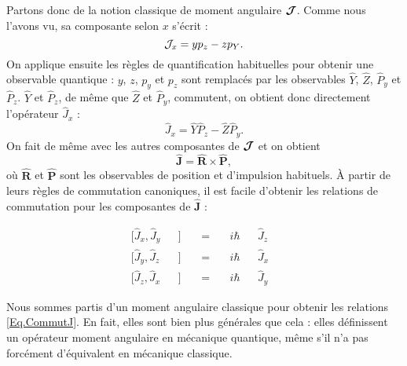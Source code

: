 Partons donc de la notion classique de moment angulaire $\bm{\mathcal{J}}$. Comme nous l'avons vu, sa composante selon $x$ s'écrit :
\begin{equation*}
\mathcal{J}_x=yp_z-zp_Y.
\end{equation*}
On applique ensuite les règles de quantification habituelles pour obtenir une observable quantique : $y$, $z$, $p_y$ et $p_z$ sont remplacés par les observables $\hat{Y}$, $\hat{Z}$, $\hat{P}_y$ et $\hat{P}_z$. $\hat{Y}$ et $\hat{P}_z$, de même que $\hat{Z}$ et $\hat{P}_y$, commutent, on obtient donc directement l'opérateur $\hat{J}_x$ :
\begin{equation*}
\hat{J}_x=\hat{Y}\hat{P}_z-\hat{Z}\hat{P}_y.
\end{equation*}
On fait de même avec les autres composantes de $\bm{\mathcal{J}}$ et on obtient 
\begin{equation*}
\bm{\hat{J}}=\bm{\hat{R}}\times\bm{\hat{P}},
\end{equation*}
où $\bm{\hat{R}}$ et $\bm{\hat{P}}$ sont les observables de position et d'impulsion habituels. \`A partir de leurs règles de commutation canoniques, il est facile d'obtenir les relations de commutation pour les composantes de $\bm{\hat{J}}$ :

\begin{equation}
\begin{alignedat}{6}
&[\hat{J}_x,\hat{J}_y&&]~&&=~&&i\hbar &&\hat{J}_z&&\\
&[\hat{J}_y,\hat{J}_z&&]~&&=~&&i\hbar &&\hat{J}_x&&\\
&[\hat{J}_z,\hat{J}_x&&]~&&=~&&i\hbar &&\hat{J}_y&&
\end{alignedat}
\label{Eq.CommutJ}
\end{equation}

Nous sommes partis d'un moment angulaire classique pour obtenir les relations \ref{Eq.CommutJ}. En fait, elles sont bien plus générales que cela : elles définissent un opérateur moment angulaire en mécanique quantique, même s'il n'a pas forcément d'équivalent en mécanique classique.

